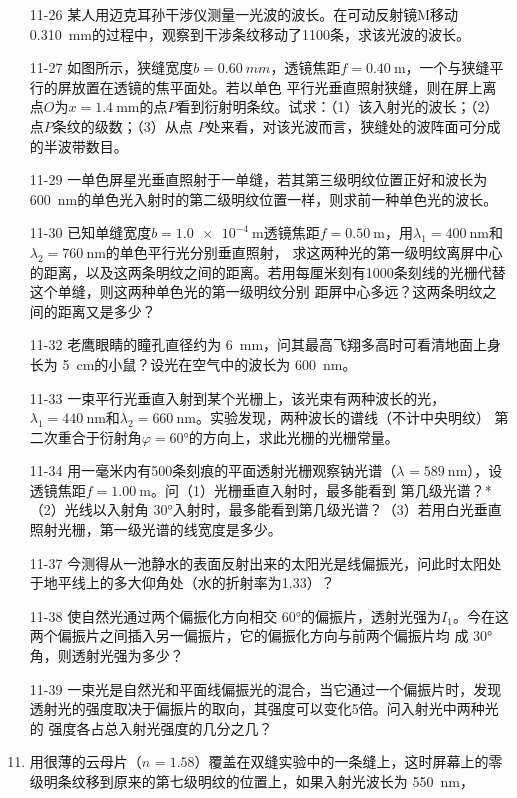 \documentclass[UTF-8]{ctexart}
\makeatletter
\newcommand{\mlabel}[2]{#2\def\@currentlabel{#2}\label{#1}}
\newcommand{\csi}[2]{ \SI{#1}{#2}}
\newcommand{\cang}[1]{ \ang{#1}}
\newcommand{\lbd}[3]{\(\lambda_{#3}=\csi{#1}{#2}\)}
\newcommand{\ri}[2]{\(n_{#2}={#1}\)}
\makeatother
\begin{document}
\begin{enumerate}
    \item[11-26] 某人用迈克耳孙干涉仪测量一光波的波长。在可动反射镜M移动\csi{0.310}{\mm}的过程中，观察到干涉条纹移动了1100条，求该光波的波长。
    \item[\mlabel{itm:27}{11-27}] 如图所示，狭缝宽度\(b=\csi{0.60}{mm}\)，透镜焦距\(f=\csi{0.40}{\m}\)，一个与狭缝平行的屏放置在透镜的焦平面处。若以单色
        平行光垂直照射狭缝，则在屏上离点\(O\)为\(x=\csi{1.4}{\mm}\)的点\(P\)看到衍射明条纹。试求：（1）该入射光的波长；（2）点\(P\)条纹的级数；（3）从点
        \(P\)处来看，对该光波而言，狭缝处的波阵面可分成的半波带数目。
    \item[11-29] 一单色屏星光垂直照射于一单缝，若其第三级明纹位置正好和波长为\csi{600}{\nm}的单色光入射时的第二级明纹位置一样，则求前一种单色光的波长。
    \item[11-30] 已知单缝宽度\(b=\csi{1.0e-4}{\m}\)透镜焦距\(f=\csi{0.50}{\m}\)，用\lbd{400}{\nm}{1}和\lbd{760}{\nm}{2}的单色平行光分别垂直照射，
        求这两种光的第一级明纹离屏中心的距离，以及这两条明纹之间的距离。若用每厘米刻有1000条刻线的光栅代替这个单缝，则这两种单色光的第一级明纹分别
        距屏中心多远？这两条明纹之间的距离又是多少？
    \item[11-32] 老鹰眼睛的瞳孔直径约为\csi{6}{\mm}，问其最高飞翔多高时可看清地面上身长为\csi{5}{\cm}的小鼠？设光在空气中的波长为\csi{600}{\nm}。
    \item[11-33] 一束平行光垂直入射到某个光栅上，该光束有两种波长的光，\lbd{440}{\nm}{1}和\lbd{660}{\nm}{2}。实验发现，两种波长的谱线（不计中央明纹）
        第二次重合于衍射角\(\varphi=\ang{60}\)的方向上，求此光栅的光栅常量。
    \item[11-34] 用一毫米内有500条刻痕的平面透射光栅观察钠光谱（\lbd{589}{\nm}{}），设透镜焦距\(f=\csi{1.00}{\m}\)。问（1）光栅垂直入射时，最多能看到
        第几级光谱？*\negthinspace（2）光线以入射角\cang{30}入射时，最多能看到第几级光谱？（3）若用白光垂直照射光栅，第一级光谱的线宽度是多少。
    \item[11-37] 今测得从一池静水的表面反射出来的太阳光是线偏振光，问此时太阳处于地平线上的多大仰角处（水的折射率为1.33）？
    \item[11-38] 使自然光通过两个偏振化方向相交\cang{60}的偏振片，透射光强为\(I_1\)。今在这两个偏振片之间插入另一偏振片，它的偏振化方向与前两个偏振片均
        成\cang{30}角，则透射光强为多少？
    \item[11-39] 一束光是自然光和平面线偏振光的混合，当它通过一个偏振片时，发现透射光的强度取决于偏振片的取向，其强度可以变化5倍。问入射光中两种光的
        强度各占总入射光强度的几分之几？
    \item 用很薄的云母片（\ri{1.58}{}）覆盖在双缝实验中的一条缝上，这时屏幕上的零级明条纹移到原来的第七级明纹的位置上，如果入射光波长为\csi{550}{\nm}，

\end{enumerate}
\end{document}
